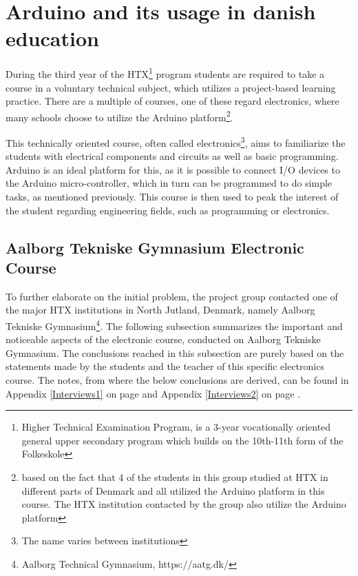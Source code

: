 
\section{Arduino and its usage in danish education}
During the third year of the HTX\footnote{Higher Technical Examination Program, is a 3-year vocationally oriented general upper secondary program which builds on the 10th-11th form of the Folkeskole\cite{htx_wiki}} program students are required to take a course in a voluntary technical subject, which utilizes a project-based learning practice. 
There are a multiple of courses, one of these regard electronics, where many schools choose to utilize the Arduino platform\footnote{based on the fact that 4 of the students in this group studied at HTX in different parts of Denmark and all utilized the Arduino platform in this course. 
The HTX institution contacted by the group also utilize the Arduino platform}\cite{holstebro_education}.

This technically oriented course, often called electronics\footnote{The name varies between institutions}, aims to familiarize the students with electrical components and circuits as well as basic programming\cite{holstebro_electronic}.
Arduino is an ideal platform for this, as it is possible to connect I/O devices to the Arduino micro-controller, which in turn can be programmed to do simple tasks, as mentioned previously. 
This course is then used to peak the interest of the student regarding engineering fields, such as programming or electronics.

\subsection{Aalborg Tekniske Gymnasium Electronic Course}
\label{htxinter}
To further elaborate on the initial problem, the project group contacted one of the major HTX institutions in North Jutland, Denmark, namely Aalborg Tekniske Gymnasium\footnote{Aalborg Technical Gymnasium, https://aatg.dk/}. 
The following subsection summarizes the important and noticeable aspects of the electronic course, conducted on Aalborg Tekniske Gymnasium. 
The conclusions reached in this subsection are purely based on the statements made by the students and the teacher of this specific electronics course.
The notes, from where the below conclusions are derived, can be found in Appendix \ref{Interviews1} on page \pageref{Interviews1} and Appendix \ref{Interviews2} on page \pageref{Interviews2}.

